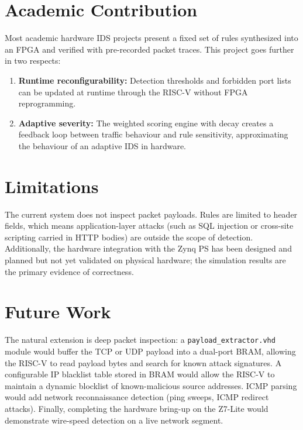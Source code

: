 \documentclass[12pt, a4paper]{report}
\begin{document}
\section{Academic Contribution}

Most academic hardware IDS projects present a fixed set of rules synthesized into an FPGA and verified with pre-recorded packet traces. This project goes further in two respects:

\begin{enumerate}
    \item \textbf{Runtime reconfigurability:} Detection thresholds and forbidden port lists can be updated at runtime through the RISC-V without FPGA reprogramming.
    \item \textbf{Adaptive severity:} The weighted scoring engine with decay creates a feedback loop between traffic behaviour and rule sensitivity, approximating the behaviour of an adaptive IDS in hardware.
\end{enumerate}

\section{Limitations}

The current system does not inspect packet payloads. Rules are limited to header fields, which means application-layer attacks (such as SQL injection or cross-site scripting carried in HTTP bodies) are outside the scope of detection. Additionally, the hardware integration with the Zynq PS has been designed and planned but not yet validated on physical hardware; the simulation results are the primary evidence of correctness.

\section{Future Work}

The natural extension is deep packet inspection: a \texttt{payload\_extractor.vhd} module would buffer the TCP or UDP payload into a dual-port BRAM, allowing the RISC-V to read payload bytes and search for known attack signatures. A configurable IP blacklist table stored in BRAM would allow the RISC-V to maintain a dynamic blocklist of known-malicious source addresses. ICMP parsing would add network reconnaissance detection (ping sweeps, ICMP redirect attacks). Finally, completing the hardware bring-up on the Z7-Lite would demonstrate wire-speed detection on a live network segment.
\end{document}
